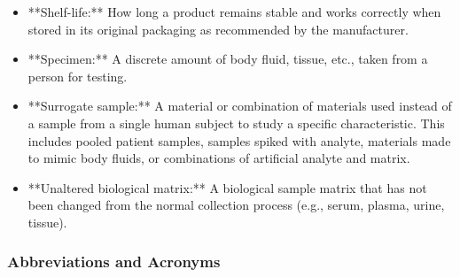 \documentclass{article}
\begin{document}
\begin{itemize}
    \item **Shelf-life:** How long a product remains stable and works correctly when stored in its original packaging as recommended by the manufacturer.
    \item **Specimen:** A discrete amount of body fluid, tissue, etc., taken from a person for testing.
    \item **Surrogate sample:** A material or combination of materials used instead of a sample from a single human subject to study a specific characteristic. This includes pooled patient samples, samples spiked with analyte, materials made to mimic body fluids, or combinations of artificial analyte and matrix.
    \item **Unaltered biological matrix:** A biological sample matrix that has not been changed from the normal collection process (e.g., serum, plasma, urine, tissue).
\end{itemize}

\subsubsection{Abbreviations and Acronyms}
\end{document}

